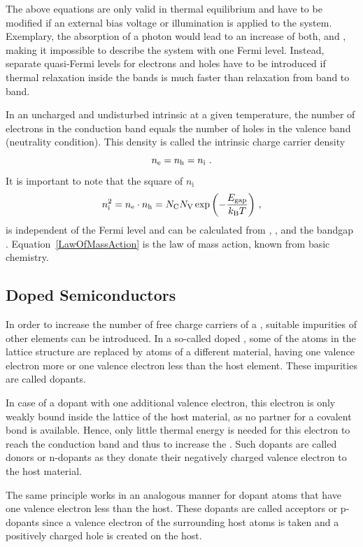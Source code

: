 The above equations are only valid in thermal equilibrium and have to be modified if an external bias voltage or illumination is applied to the system. Exemplary, the absorption of a photon would lead to an increase of both, \ne and \nh, making it impossible to describe the system with one Fermi level. Instead, separate quasi-Fermi levels for electrons and holes have to be introduced if thermal relaxation inside the bands is much faster than relaxation from band to band.

In an uncharged and undisturbed intrinsic \SC at a given temperature, the number of electrons in the conduction band equals the number of holes in the valence band (neutrality condition). This density is called the intrinsic charge carrier density \ni
\begin{equation} %
 \ne = \nh = \ni
\PUNKT
\end{equation}
It is important to note that the square of $n_\text{i}$
\begin{equation} \label{eq:LawOfMassAction}
 \ni^2 = \ne \cdot \nh = \Nc\Nv\exp{-\frac{\Egap}{\kT}}
\KOMMA
\end{equation}
is independent of the Fermi level \Ef and can be calculated from \Nv, \Nc, and the bandgap \Egap. Equation~\eqref{LawOfMassAction} is the law of mass action, known from basic chemistry. %

\subsection{Doped Semiconductors} \label{sec:TheoDopedSCs}%
In order to increase the number of free charge carriers \neh of a \SC, suitable impurities of other elements can be introduced.
In a so-called doped \SC, some of the atoms in the lattice structure are replaced by atoms of a different material, having one valence electron more or one valence electron less than the host element. These impurities are called dopants.

In case of a dopant with one additional valence electron, this electron is only weakly bound inside the lattice of the host material, as no partner for a covalent bond is available. Hence, only little thermal energy is needed for this electron to reach the conduction band and thus to increase the \neLong \ne. Such dopants are called donors or n-dopants as they donate their negatively charged valence electron to the host material.

The same principle works in an analogous manner for dopant atoms that have one valence electron less than the host.
These dopants are called acceptors or p-dopants since a valence electron of the surrounding host atoms is taken and a positively charged hole is created on the host.

